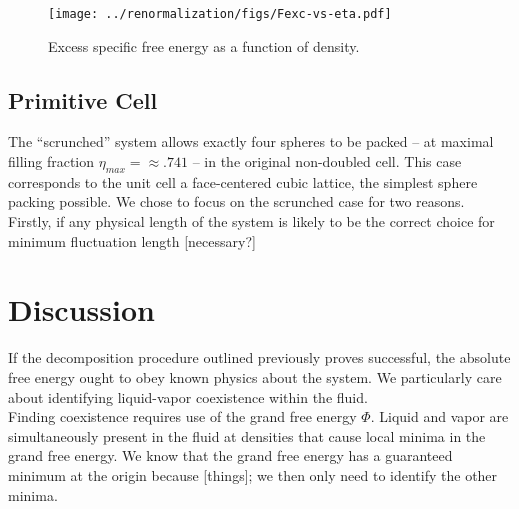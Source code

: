 \documentclass[12pt]{article}
\newcommand{\ignore}[1]{}
\begin{document}
\begin{figure}
\centering
    \texttt{[image: ../renormalization/figs/Fexc-vs-eta.pdf]}
    \caption{Excess specific free energy as a function of density.}
    \label{F-eta}
\end{figure}

\subsection{Primitive Cell}
The ``scrunched'' system allows exactly four spheres to be packed -- at maximal filling fraction $\eta_{max} = \approx .741$ -- in the original non-doubled cell. This case corresponds to the unit cell a face-centered cubic lattice, the simplest sphere packing possible. We chose to focus on the scrunched case for two reasons. Firstly, if any physical length of the system is likely to be the correct choice for minimum fluctuation length [necessary?]

\ignore{ Might never need these sections. |
\subsubsection{Seed Disparity}
Because of the random/psuedorandom nature of Monte Carlo sampling, we tested over many different initial sphere placements (``seeds'') to see if there was consistent agreement. 
\subsection{Other Cells?}
In addition to the ``scrunched'' primitive cell, we tested [hopefully one or two] other minimum correlation lengths corresponding to other natural parameters in the system.}


\section{Discussion}
If the decomposition procedure outlined previously proves successful, the absolute free energy ought to obey known physics about the system.
We particularly care about identifying liquid-vapor coexistence within the fluid. \\

Finding coexistence requires use of the grand free energy $\Phi$. Liquid and vapor are simultaneously present in the fluid at densities that cause local minima in the grand free energy. We know that the grand free energy has a guaranteed minimum at the origin because [things]; we then only need to identify the other minima.  \\
\end{document}
